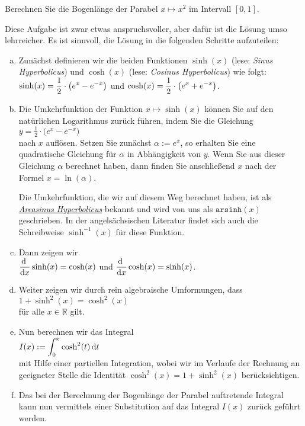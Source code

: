 \exercise
Berechnen Sie die Bogenl\"ange der Parabel $x \mapsto x^2$ im Intervall $[0,1]$. 

\hint
Diese Aufgabe ist zwar etwas anspruchsvoller, aber daf\"ur ist die L\"osung umso lehrreicher.  Es ist
sinnvoll, die L\"osung in die folgenden Schritte aufzuteilen:
\begin{enumerate}[(a)]
\item Zun\"achst definieren wir die beiden Funktionen $\sinh(x)$ (lese: \emph{Sinus Hyperbolicus}) und
      $\cosh(x)$ (lese: \emph{Cosinus Hyperbolicus}) wie folgt:
      \\[0.2cm]
      \hspace*{1.3cm}
      $\displaystyle\sinh(x) = \frac{1}{2} \cdot \bigl(e^x - e^{-x}\bigr)$ \quad und \quad
      $\displaystyle\cosh(x) = \frac{1}{2} \cdot \bigl(e^x + e^{-x}\bigr)$. 
\item Die Umkehrfunktion der Funktion $x \mapsto \sinh(x)$ k\"onnen Sie auf den nat\"urlichen
      Logarithmus zur\"uck f\"uhren, indem Sie die Gleichung
      \\[0.2cm]
      \hspace*{1.3cm}
      $y = \frac{1}{2} \cdot \bigl(e^x - e^{-x}\bigr)$
      \\[0.2cm]
      nach $x$ aufl\"osen.  Setzen Sie zun\"achst $\alpha := e^x$, so erhalten Sie eine quadratische
      Gleichung f\"ur $\alpha$ in Abh\"angigkeit von $y$.  Wenn Sie aus dieser Gleichung $\alpha$
      berechnet haben, dann finden Sie anschlie{\ss}end $x$ nach der Formel $x = \ln(\alpha)$.

      Die Umkehrfunktion, die wir auf diesem Weg berechnet haben, ist als 
      \href{https://de.wikipedia.org/wiki/Areasinus_Hyperbolicus_und_Areakosinus_Hyperbolicus}{\emph{Areasinus Hyperbolicus}}
      bekannt und wird von uns als $\mathtt{arsinh}(x)$ geschrieben.  In der angels\"achsischen
      Literatur findet sich auch die Schreibweise $\sinh^{-1}(x)$ f\"ur diese Funktion.
\item Dann zeigen wir
      \\[0.2cm]
      \hspace*{1.3cm}
      $\displaystyle\frac{\textrm{d}\;}{\textrm{d}x} \sinh(x) = \cosh(x)$ \quad und \quad $\displaystyle\frac{\textrm{d}\;}{\textrm{d}x} \cosh(x) = \sinh(x)$.
\item Weiter zeigen wir durch rein algebraische Umformungen, dass
      \\[0.2cm]
      \hspace*{1.3cm}
      $1 + \sinh^2(x) = \cosh^2(x)$
      \\[0.2cm]
      f\"ur alle $x\in \mathbb{R}$ gilt.
\item Nun berechnen wir das Integral
      \\[0.2cm]
      \hspace*{1.3cm}
      $\displaystyle I(x) := \int_0^x \cosh^2(t)\, \textrm{d} t$
      \\[0.2cm]
      mit Hilfe einer partiellen Integration, wobei wir im Verlaufe der Rechnung an geeigneter
      Stelle die Identit\"at $\cosh^2(x) = 1 + \sinh^2(x)$ ber\"ucksichtigen. 
\item Das bei der Berechnung der Bogenl\"ange der Parabel auftretende Integral kann nun vermittels einer
      Substitution auf das Integral $I(x)$ zur\"uck gef\"uhrt werden. \eod 
\end{enumerate}


